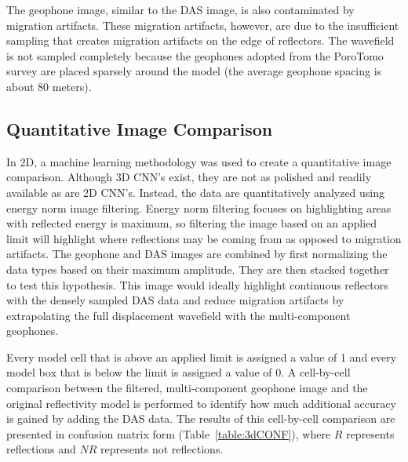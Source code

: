 The geophone image, similar to the DAS image, is also contaminated by migration artifacts. These migration artifacts, however, are due to the insufficient sampling that creates migration artifacts on the edge of reflectors. The wavefield is not sampled completely because the geophones adopted from the PoroTomo survey are placed sparsely around the model (the average geophone spacing is about 80 meters).

\subsection{Quantitative Image Comparison}
In 2D, a machine learning methodology was used to create a quantitative image comparison. Although 3D CNN's exist, they are not as polished and readily available as are 2D CNN's. Instead, the data are quantitatively analyzed using energy norm image filtering. Energy norm filtering focuses on highlighting areas with reflected energy is maximum, so filtering the image based on an applied limit will highlight where reflections may be coming from as opposed to migration artifacts. The geophone and DAS images are combined by first normalizing the data types based on their maximum amplitude. They are then stacked together to test this hypothesis. This image would ideally highlight continuous reflectors with the densely sampled DAS data and reduce migration artifacts by extrapolating the full displacement wavefield with the multi-component geophones.

Every model cell that is above an applied limit is assigned a value of 1 and every model box that is below the limit is assigned a value of 0. A cell-by-cell comparison between the filtered, multi-component geophone image and the original reflectivity model is performed to identify how much additional accuracy is gained by adding the DAS data. The results of this cell-by-cell comparison are presented in confusion matrix form (Table~\ref{table:3dCONF}), where $R$ represents reflections and $NR$ represents not reflections.



